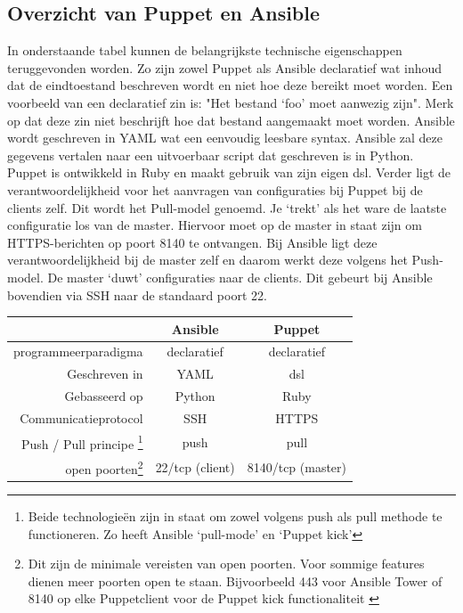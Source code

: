 \subsection{Overzicht van Puppet en Ansible}

In onderstaande tabel kunnen de belangrijkste technische eigenschappen teruggevonden worden. Zo zijn zowel Puppet als Ansible declaratief wat inhoud dat de eindtoestand beschreven wordt en niet hoe deze bereikt moet worden. Een voorbeeld van een declaratief zin is: "Het bestand `foo' moet aanwezig zijn". Merk op dat deze zin niet beschrijft hoe dat bestand aangemaakt moet worden. \newline
Ansible wordt geschreven in YAML wat een eenvoudig leesbare syntax. Ansible zal deze gegevens vertalen naar een uitvoerbaar script dat geschreven is in Python. Puppet is ontwikkeld in Ruby en maakt gebruik van zijn eigen \gls{dsl}. \newline
Verder ligt de verantwoordelijkheid voor het aanvragen van configuraties bij Puppet bij de clients zelf. Dit wordt het Pull-model genoemd. Je `trekt' als het ware de laatste configuratie los van de master. Hiervoor moet op de master in staat zijn om HTTPS-berichten op poort 8140 te ontvangen. Bij Ansible ligt deze verantwoordelijkheid bij de master zelf en daarom werkt deze volgens het Push-model. De master `duwt' configuraties naar de clients. Dit gebeurt bij Ansible bovendien via SSH naar de standaard poort 22.

\begin{minipage}{15cm}
\begin{tabular}{ r |c c }
& \textbf{Ansible} & \textbf{Puppet} \\
  \hline	  		
\gls{programmeerparadigma}  & declaratief & declaratief  \\
\hline
Geschreven in & YAML & \gls{dsl}  \\
\hline
Gebasseerd op & Python & Ruby \\
\hline
Communicatieprotocol & SSH & HTTPS \\

\hline
  Push / Pull principe \footnote{Beide technologie\"en zijn in staat om zowel volgens push als pull methode te functioneren. Zo heeft Ansible ‘pull-mode' \autocite{ansiblePull} en \textcite{puppetkick} ‘Puppet kick' } & \gls{push} & \gls{pull} \\
   \hline
   open poorten\footnote{Dit zijn de minimale vereisten van open poorten. Voor sommige features dienen meer poorten open te staan. Bijvoorbeeld 443 voor Ansible Tower of 8140 op elke Puppetclient voor de Puppet kick functionaliteit \autocite{puppetkick} }  & 22/tcp (client) & 8140/tcp (master)\\
  \end{tabular}
  \end{minipage}   

